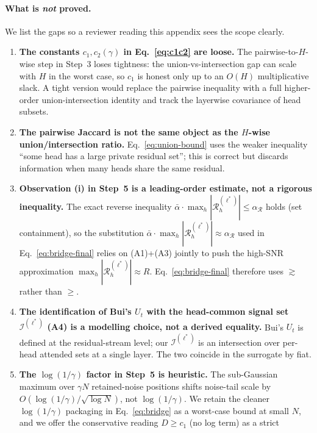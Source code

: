 \documentclass{article}
\begin{document}
\paragraph{What is \emph{not} proved.}
We list the gaps so a reviewer reading this appendix sees the scope
clearly.
\begin{enumerate}
  \item \textbf{The constants $c_1, c_2(\gamma)$ in
  Eq.~\eqref{eq:c1c2} are loose.} The pairwise-to-$H$-wise step in
  Step~3 loses tightness: the union-vs-intersection gap can scale with
  $H$ in the worst case, so $c_1$ is honest only up to an $O(H)$
  multiplicative slack. A tight version would replace the pairwise
  inequality with a full higher-order union-intersection identity and
  track the layerwise covariance of head subsets.
  \item \textbf{The pairwise Jaccard is not the same object as the
  $H$-wise union/intersection ratio.} Eq.~\eqref{eq:union-bound} uses
  the weaker inequality ``some head has a large private residual
  set''; this is correct but discards information when many heads share
  the same residual.
  \item \textbf{Observation (i) in Step~5 is a leading-order estimate,
  not a rigorous inequality.} The exact reverse inequality $\bar\alpha
  \cdot \max_h |\mathcal{R}^{(\ell^*)}_h| \leq \alpha_{\mathcal{R}}$
  holds (set containment), so the substitution $\bar\alpha \cdot \max_h
  |\mathcal{R}^{(\ell^*)}_h| \approx \alpha_{\mathcal{R}}$ used in
  Eq.~\eqref{eq:bridge-final} relies on (A1)+(A3) jointly to push the
  high-SNR approximation $\max_h |\mathcal{R}^{(\ell^*)}_h| \approx R$.
  Eq.~\eqref{eq:bridge-final} therefore uses $\gtrsim$ rather than
  $\geq$.
  \item \textbf{The identification of Bui's $U_t$ with the head-common
  signal set $\mathcal{I}^{(\ell^*)}$ (A4) is a modelling choice, not a
  derived equality.} Bui's $U_t$ is defined at the residual-stream
  level; our $\mathcal{I}^{(\ell^*)}$ is an intersection over per-head
  attended sets at a single layer. The two coincide in the surrogate by
  fiat.
  \item \textbf{The $\log(1/\gamma)$ factor in Step~5 is heuristic.} The
  sub-Gaussian maximum over $\gamma N$ retained-noise positions shifts
  noise-tail scale by $O(\log(1/\gamma) / \sqrt{\log N})$, not
  $\log(1/\gamma)$. We retain the cleaner $\log(1/\gamma)$ packaging in
  Eq.~\eqref{eq:bridge} as a worst-case bound at small $N$, and we offer
  the conservative reading $D \geq c_1$ (no log term) as a strict

\end{enumerate}
\end{document}
